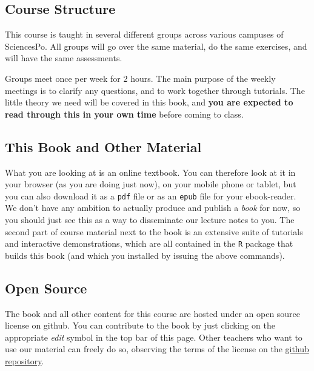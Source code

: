 \documentclass[]{book}
\begin{document}
\hypertarget{course-structure}{%
\subsection*{Course Structure}\label{course-structure}}

This course is taught in several different groups across various campuses of SciencesPo. All groups will go over the same material, do the same exercises, and will have the same assessments.

Groups meet once per week for 2 hours. The main purpose of the weekly meetings is to clarify any questions, and to work together through tutorials. The little theory we need will be covered in this book, and \textbf{you are expected to read through this in your own time} before coming to class.

\hypertarget{this-book-and-other-material}{%
\subsection*{This Book and Other Material}\label{this-book-and-other-material}}

What you are looking at is an online textbook. You can therefore look at it in your browser (as you are doing just now), on your mobile phone or tablet, but you can also download it as a \texttt{pdf} file or as an \texttt{epub} file for your ebook-reader. We don't have any ambition to actually produce and publish a \emph{book} for now, so you should just see this as a way to disseminate our lecture notes to you.
The second part of course material next to the book is an extensive suite of tutorials and interactive demonstrations, which are all contained in the \texttt{R} package that builds this book (and which you installed by issuing the above commands).

\hypertarget{open-source}{%
\subsection*{Open Source}\label{open-source}}

The book and all other content for this course are hosted under an open source license on github. You can contribute to the book by just clicking on the appropriate \emph{edit} symbol in the top bar of this page. Other teachers who want to use our material can freely do so, observing the terms of the license on the \href{https://github.com/ScPoEcon/ScPoEconometrics}{github repository}.
\end{document}
